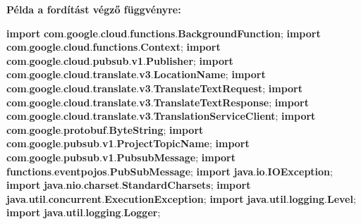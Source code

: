 \documentclass[
]{article}
\newenvironment{Shaded}{}{}
\newcommand{\ImportTok}[1]{\textcolor[rgb]{0.00,0.50,0.00}{\textbf{#1}}}
\newcommand{\KeywordTok}[1]{\textcolor[rgb]{0.00,0.44,0.13}{\textbf{#1}}}
\newcommand{\OperatorTok}[1]{\textcolor[rgb]{0.40,0.40,0.40}{#1}}
\begin{document}
\textbf{Példa a fordítást végző függvényre:}

\begin{Shaded}
\begin{Highlighting}[]
\KeywordTok{import} \ImportTok{com}\OperatorTok{.}\ImportTok{google}\OperatorTok{.}\ImportTok{cloud}\OperatorTok{.}\ImportTok{functions}\OperatorTok{.}\ImportTok{BackgroundFunction}\OperatorTok{;}
\KeywordTok{import} \ImportTok{com}\OperatorTok{.}\ImportTok{google}\OperatorTok{.}\ImportTok{cloud}\OperatorTok{.}\ImportTok{functions}\OperatorTok{.}\ImportTok{Context}\OperatorTok{;}
\KeywordTok{import} \ImportTok{com}\OperatorTok{.}\ImportTok{google}\OperatorTok{.}\ImportTok{cloud}\OperatorTok{.}\ImportTok{pubsub}\OperatorTok{.}\ImportTok{v1}\OperatorTok{.}\ImportTok{Publisher}\OperatorTok{;}
\KeywordTok{import} \ImportTok{com}\OperatorTok{.}\ImportTok{google}\OperatorTok{.}\ImportTok{cloud}\OperatorTok{.}\ImportTok{translate}\OperatorTok{.}\ImportTok{v3}\OperatorTok{.}\ImportTok{LocationName}\OperatorTok{;}
\KeywordTok{import} \ImportTok{com}\OperatorTok{.}\ImportTok{google}\OperatorTok{.}\ImportTok{cloud}\OperatorTok{.}\ImportTok{translate}\OperatorTok{.}\ImportTok{v3}\OperatorTok{.}\ImportTok{TranslateTextRequest}\OperatorTok{;}
\KeywordTok{import} \ImportTok{com}\OperatorTok{.}\ImportTok{google}\OperatorTok{.}\ImportTok{cloud}\OperatorTok{.}\ImportTok{translate}\OperatorTok{.}\ImportTok{v3}\OperatorTok{.}\ImportTok{TranslateTextResponse}\OperatorTok{;}
\KeywordTok{import} \ImportTok{com}\OperatorTok{.}\ImportTok{google}\OperatorTok{.}\ImportTok{cloud}\OperatorTok{.}\ImportTok{translate}\OperatorTok{.}\ImportTok{v3}\OperatorTok{.}\ImportTok{TranslationServiceClient}\OperatorTok{;}
\KeywordTok{import} \ImportTok{com}\OperatorTok{.}\ImportTok{google}\OperatorTok{.}\ImportTok{protobuf}\OperatorTok{.}\ImportTok{ByteString}\OperatorTok{;}
\KeywordTok{import} \ImportTok{com}\OperatorTok{.}\ImportTok{google}\OperatorTok{.}\ImportTok{pubsub}\OperatorTok{.}\ImportTok{v1}\OperatorTok{.}\ImportTok{ProjectTopicName}\OperatorTok{;}
\KeywordTok{import} \ImportTok{com}\OperatorTok{.}\ImportTok{google}\OperatorTok{.}\ImportTok{pubsub}\OperatorTok{.}\ImportTok{v1}\OperatorTok{.}\ImportTok{PubsubMessage}\OperatorTok{;}
\KeywordTok{import} \ImportTok{functions}\OperatorTok{.}\ImportTok{eventpojos}\OperatorTok{.}\ImportTok{PubSubMessage}\OperatorTok{;}
\KeywordTok{import} \ImportTok{java}\OperatorTok{.}\ImportTok{io}\OperatorTok{.}\ImportTok{IOException}\OperatorTok{;}
\KeywordTok{import} \ImportTok{java}\OperatorTok{.}\ImportTok{nio}\OperatorTok{.}\ImportTok{charset}\OperatorTok{.}\ImportTok{StandardCharsets}\OperatorTok{;}
\KeywordTok{import} \ImportTok{java}\OperatorTok{.}\ImportTok{util}\OperatorTok{.}\ImportTok{concurrent}\OperatorTok{.}\ImportTok{ExecutionException}\OperatorTok{;}
\KeywordTok{import} \ImportTok{java}\OperatorTok{.}\ImportTok{util}\OperatorTok{.}\ImportTok{logging}\OperatorTok{.}\ImportTok{Level}\OperatorTok{;}
\KeywordTok{import} \ImportTok{java}\OperatorTok{.}\ImportTok{util}\OperatorTok{.}\ImportTok{logging}\OperatorTok{.}\ImportTok{Logger}\OperatorTok{;}


\end{Highlighting}
\end{Shaded}
\end{document}
